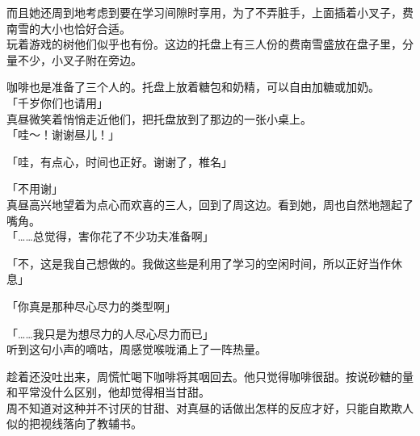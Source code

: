 而且她还周到地考虑到要在学习间隙时享用，为了不弄脏手，上面插着小叉子，费南雪的大小也恰好合适。\\

玩着游戏的树他们似乎也有份。这边的托盘上有三人份的费南雪盛放在盘子里，分量不少，小叉子附在旁边。

咖啡也是准备了三个人的。托盘上放着糖包和奶精，可以自由加糖或加奶。\\

「千岁你们也请用」\\

真昼微笑着悄悄走近他们，把托盘放到了那边的一张小桌上。\\

「哇～！谢谢昼儿！」

「哇，有点心，时间也正好。谢谢了，椎名」

「不用谢」\\

真昼高兴地望着为点心而欢喜的三人，回到了周这边。看到她，周也自然地翘起了嘴角。\\

「……总觉得，害你花了不少功夫准备啊」

「不，这是我自己想做的。我做这些是利用了学习的空闲时间，所以正好当作休息」

「你真是那种尽心尽力的类型啊」

「……我只是为想尽力的人尽心尽力而已」\\

听到这句小声的嘀咕，周感觉喉咙涌上了一阵热量。

趁着还没吐出来，周慌忙喝下咖啡将其咽回去。他只觉得咖啡很甜。按说砂糖的量和平常没什么区别，他却觉得相当甘甜。\\

周不知道对这种并不讨厌的甘甜、对真昼的话做出怎样的反应才好，只能自欺欺人似的把视线落向了教辅书。
